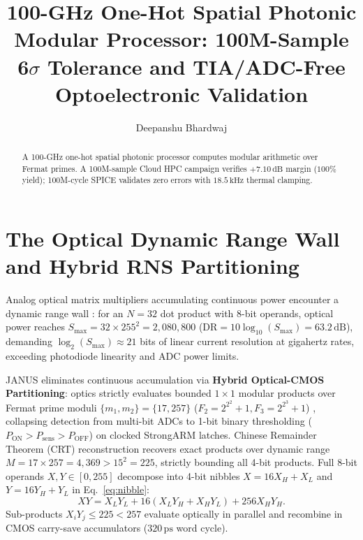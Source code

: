 \documentclass[letterpaper,10pt]{article}
\title{100-GHz One-Hot Spatial Photonic Modular Processor: 100M-Sample 6$\sigma$ Tolerance and TIA/ADC-Free Optoelectronic Validation}
\author{Deepanshu Bhardwaj\authormark{1,*}}
\begin{document}
\maketitle

\begin{abstract}
A 100-GHz one-hot spatial photonic processor computes modular arithmetic over Fermat primes. A 100M-sample Cloud HPC campaign verifies $+7.10\,\text{dB}$ margin ($100\%$ yield); 100M-cycle SPICE validates zero errors with $18.5\,\text{kHz}$ thermal clamping.
\end{abstract}

\section{The Optical Dynamic Range Wall and Hybrid RNS Partitioning}
Analog optical matrix multipliers accumulating continuous power encounter a dynamic range wall \cite{Shen2017}: for an $N=32$ dot product with 8-bit operands, optical power reaches $S_{\max} = 32 \times 255^2 = 2{,}080{,}800$ ($\text{DR} = 10\log_{10}(S_{\max}) = 63.2\,\text{dB}$), demanding $\log_2(S_{\max}) \approx 21$ bits of linear current resolution at gigahertz rates, exceeding photodiode linearity and ADC power limits.

JANUS eliminates continuous accumulation via \textbf{Hybrid Optical-CMOS Partitioning}: optics strictly evaluates bounded $1 \times 1$ modular products over Fermat prime moduli $\{m_1, m_2\} = \{17, 257\}$ ($F_2 = 2^{2^2}+1, F_3 = 2^{2^3}+1$) \cite{Huang1979, Mohan2016, Zheng2024}, collapsing detection from multi-bit ADCs to 1-bit binary thresholding ($P_{\text{ON}} > P_{\text{sens}} > P_{\text{OFF}}$) on clocked StrongARM latches. Chinese Remainder Theorem (CRT) reconstruction recovers exact products over dynamic range $M = 17 \times 257 = 4{,}369 > 15^2 = 225$, strictly bounding all 4-bit products. Full 8-bit operands $X, Y \in [0, 255]$ decompose into 4-bit nibbles $X = 16 X_H + X_L$ and $Y = 16 Y_H + Y_L$ in Eq.~\eqref{eq:nibble}:
\begin{equation}
XY = X_L Y_L + 16(X_L Y_H + X_H Y_L) + 256 X_H Y_H.
\label{eq:nibble}
\end{equation}
Sub-products $X_i Y_j \le 225 < 257$ evaluate optically in parallel and recombine in CMOS carry-save accumulators ($320\,\text{ps}$ word cycle).
\end{document}
